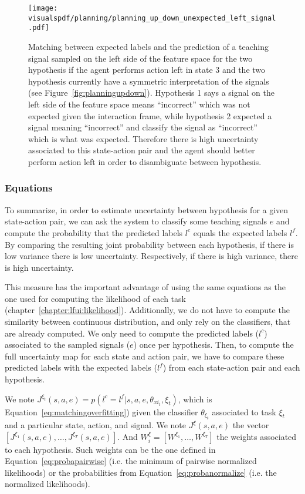 \begin{figure}[!htbp]
  \centering
  \texttt{[image: \\visualspdf/planning/planning\_up\_down\_unexpected\_left\_signal.pdf]}
  \caption{Matching between expected labels and the prediction of a teaching signal sampled on the left side of the feature space for the two hypothesis if the agent performs action left in state 3 and the two hypothesis currently have a symmetric interpretation of the signals (see Figure~\ref{fig:planningupdown}). Hypothesis 1 says a signal on the left side of the feature space means ``incorrect'' which was not expected given the interaction frame, while hypothesis 2 expected a signal meaning ``incorrect'' and classify the signal as ``incorrect'' which is what was expected. Therefore there is high uncertainty associated to this state-action pair and the agent should better perform action left in order to disambiguate between hypothesis.}
  \label{fig:uncertaintymeaningupdownunexpectedleft}
\end{figure}

\subsubsection*{Equations}

To summarize, in order to estimate uncertainty between hypothesis for a given state-action pair, we can ask the system to classify some teaching signals $e$ and compute the probability that the predicted labels $l^c$ equals the expected labels $l^f$. By comparing the resulting joint probability between each hypothesis, if there is low variance there is low uncertainty. Respectively, if there is high variance, there is high uncertainty. 

This measure has the important advantage of using the same equations as the one used for computing the likelihood of each task (chapter~\ref{chapter:lfui:likelihood}). Additionally, we do not have to compute the similarity between continuous distribution, and only rely on the classifiers, that are already computed. We only need to compute the predicted labels ($l^c$) associated to the sampled signals ($e$) once per hypothesis. Then, to compute the full uncertainty map for each state and action pair, we have to compare these predicted labels with the expected labels ($l^f$) from each state-action pair and each hypothesis.

We note $J^{\xi_t}(s,a,e) = p(l^c = l^f | s, a, e, \theta_{xi_t}, \xi_t)$, which is Equation~\ref{eq:matchingoverfitting}) given the classifier $\theta_{\xi_t}$ associated to task $\xi_t$ and a particular state, action, and signal. We note $J^{\xi}(s,a,e)$ the vector $[J^{\xi_1}(s,a,e), \ldots, J^{\xi_T}(s,a,e)]$. And $W_{i}^{\xi} = [W^{\xi_1}, \ldots, W^{\xi_T}]$ the weights associated to each hypothesis. Such weights can be the one defined in Equation~\ref{eq:probapairwise} (i.e. the minimum of pairwise normalized likelihoods) or the probabilities from Equation~\ref{eq:probanormalize} (i.e. the normalized likelihoods).


